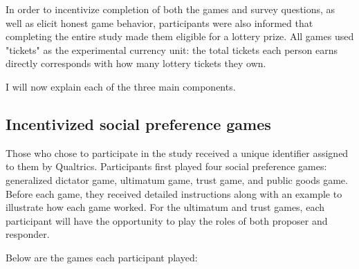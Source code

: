 \documentclass[12pt]{article}
\begin{document}
In order to incentivize completion of both the games and survey questions, as well as elicit honest game behavior, participants were also informed that completing the entire study made them eligible for a lottery prize. All games used "tickets" as the experimental currency unit: the total tickets each person earns directly corresponds with how many lottery tickets they own.

I will now explain each of the three main components.

\subsection{Incentivized social preference games}

Those who chose to participate in the study received a unique identifier assigned to them by Qualtrics. Participants first played four social preference games: generalized dictator game, ultimatum game, trust game, and public goods game. Before each game, they received detailed instructions along with an example to illustrate how each game worked. For the ultimatum and trust games, each participant will have the opportunity to play the roles of both proposer and responder.

Below are the games each participant played: 
\end{document}
